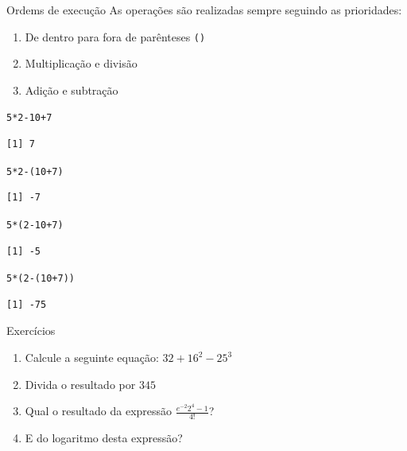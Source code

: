 \documentclass[10pt,handout]{beamer}\usepackage[]{graphicx}\usepackage[]{color}
\makeatletter
\newcommand{\hlnum}[1]{\textcolor[rgb]{0.686,0.059,0.569}{#1}}%
\newcommand{\hlopt}[1]{\textcolor[rgb]{0,0,0}{#1}}%
\newcommand{\hlstd}[1]{\textcolor[rgb]{0.345,0.345,0.345}{#1}}%
\newenvironment{kframe}{%
 \def\at@end@of@kframe{}%
 \ifinner\ifhmode%
  \def\at@end@of@kframe{\end{minipage}}%
  \begin{minipage}{\columnwidth}%
 \fi\fi%
 \def\FrameCommand##1{\hskip\@totalleftmargin \hskip-\fboxsep
 \colorbox{shadecolor}{##1}\hskip-\fboxsep
     \hskip-\linewidth \hskip-\@totalleftmargin \hskip\columnwidth}%
 \MakeFramed {\advance\hsize-\width
   \@totalleftmargin\z@ \linewidth\hsize
   \@setminipage}}%
 {\par\unskip\endMakeFramed%
 \at@end@of@kframe}
\newenvironment{knitrout}{}{} %
\makeatother
\begin{document}
\begin{frame}[fragile]{Ordems de execução}
As operações são realizadas sempre seguindo as prioridades:
\begin{enumerate}
\item De dentro para fora de parênteses \verb|()|
\item Multiplicação e divisão
\item Adição e subtração
\end{enumerate}
\begin{knitrout}\small
{}\color{fgcolor}\begin{kframe}
\begin{alltt}
\hlnum{5} \hlopt{*} \hlnum{2} \hlopt{-} \hlnum{10} \hlopt{+} \hlnum{7}
\end{alltt}
\begin{verbatim}
[1] 7
\end{verbatim}
\begin{alltt}
\hlnum{5} \hlopt{*} \hlnum{2} \hlopt{-} \hlstd{(}\hlnum{10} \hlopt{+} \hlnum{7}\hlstd{)}
\end{alltt}
\begin{verbatim}
[1] -7
\end{verbatim}
\begin{alltt}
\hlnum{5} \hlopt{*} \hlstd{(}\hlnum{2} \hlopt{-} \hlnum{10} \hlopt{+} \hlnum{7}\hlstd{)}
\end{alltt}
\begin{verbatim}
[1] -5
\end{verbatim}
\begin{alltt}
\hlnum{5} \hlopt{*} \hlstd{(}\hlnum{2} \hlopt{-} \hlstd{(}\hlnum{10} \hlopt{+} \hlnum{7}\hlstd{))}
\end{alltt}
\begin{verbatim}
[1] -75
\end{verbatim}
\end{kframe}
\end{knitrout}

\end{frame}

\begin{frame}[fragile]{Exercícios}
  \begin{enumerate}
  \item Calcule a seguinte equação: $32 + 16^2 - 25^3$
  \item Divida o resultado por $345$
  \item Qual o resultado da expressão $\frac{e^{-2}  2^{4} - 1}{4!}$?
  \item E do logaritmo desta expressão?
  \end{enumerate}
\end{frame}
\end{document}
